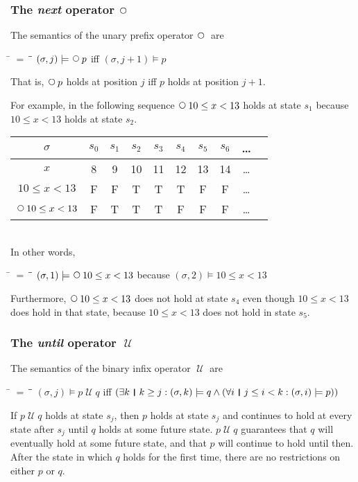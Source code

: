 \documentclass[12pt, fleqn, leqno]{article}
\newcommand{\lllgap}{12pt}                          %
\newcommand{\mymathindent}{24pt}                    %
\newcommand{\Until}{\;\mathcal{U}\;}
\newcommand{\Next}{\;\,\text{\raisebox{3.5pt}{\circle{6}}}}
\newcommand{\myqedtab}{\hspace{384pt}}              %
\newcommand{\thedr}{\rule[-.25ex]{.32mm}{1.75ex}}   %
\newcommand{\dr}{\;\,\thedr\,\;}                    %
\newcommand{\rb}{:}                                 %
\newcommand{\all}{\forall}                          %
\newcommand{\ext}{\exists}                          %
\begin{document}
\subsubsection*{The \textit{next} operator $\Next$}

The semantics of the unary prefix operator $\Next$ are
\begin{tabbing}
\hspace{\mymathindent} \= $= \;$ \= \myqedtab \= \kill
  \> $(\sigma, j) \models \Next p$ \quad iff \quad $(\sigma, j+1) \models p$
\end{tabbing}
That is, $\Next p$ holds at position $j$ iff $p$ holds at position $j+1$.

For example, in the following sequence $\Next 10\le x< 13$ holds at state $s_1$ because $10\le x< 13$ holds at state $s_2$.\\[\lllgap]
\begin{tabular}{c|ccccccccc}
  $\sigma$             & $s_0$ & $s_1$ & $s_2$ & $s_3$ & $s_4$ & $s_5$ & $s_6$ & \dots \\
  \hline
  $x$                  & 8     & 9     & 10    & 11    & 12    & 13    & 14    & \dots\\
  $10\le x< 13$        & F     & F     & T     & T     & T     & F     & F     & \dots\\
  $\Next 10\le x< 13$  & F     & T     & T     & T     & F     & F     & F     & \dots
\end{tabular}\\[\lllgap]
In other words,
\begin{tabbing}
\hspace{\mymathindent} \= $= \;$ \= \myqedtab \= \kill
  \> $(\sigma, 1) \models \Next 10\le x< 13$ \quad because \quad $(\sigma, 2) \models 10\le x< 13$
\end{tabbing}
Furthermore, $\Next 10\le x< 13$ does not hold at state $s_4$ even though $10\le x< 13$ does hold in that state, because $10\le x< 13$ does not hold in state $s_5$.

\subsubsection*{The \textit{until} operator $\Until$}

The semantics of the binary infix operator $\Until$ are
\begin{tabbing}
\hspace{\mymathindent} \= $= \;$ \= \myqedtab \= \kill
  \> $(\sigma, j) \models p \Until q$ \quad iff \quad $(\ext k \dr k \ge j \rb (\sigma,k) \models q \land
      (\all i \dr j\le i < k \rb (\sigma,i) \models p))$
\end{tabbing}
If $p \Until q$ holds at state $s_j$, then $p$ holds at state $s_j$ and continues to hold at every state
after $s_j$ until $q$ holds at some future state.
$p \Until q$ guarantees that $q$ will eventually hold at some future state, and that $p$ will continue to hold until then.
After the state in which $q$ holds for the first time, there are no restrictions on either $p$ or $q$.
\end{document}
